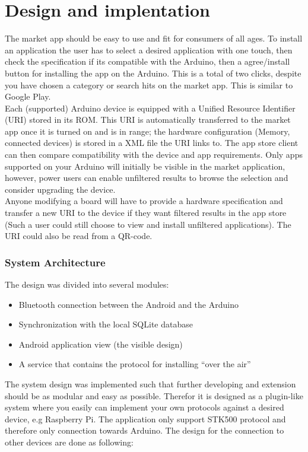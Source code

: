 \chapter{Design and implentation}
The market app should be easy to use and fit for consumers of all ages. To install an application the user has to select a desired application with one touch, then check the specification if its compatible with the Arduino, then a agree/install button for installing the app on the Arduino. This is a total of two clicks, despite you have chosen a category or search hits on the market app. This is similar to Google Play.\\
\newline
Each (supported) Arduino device is equipped with a Unified Resource Identifier (URI) stored in its ROM. This URI is automatically transferred to the market app once it is turned on and is in range; the hardware configuration (Memory, connected devices) is stored in a XML file the URI links to.
The app store client can then compare compatibility with the device and app requirements.
Only apps supported on your Arduino will initially be visible in the market application, however, power users can enable unfiltered results to browse the selection and consider upgrading the device.\\
\newline
Anyone modifying a board will have to provide a hardware specification and transfer a new URI to the device if they want filtered results in the app store (Such a user could still choose to view and install unfiltered applications).
The URI could also be read from a QR-code.

\subsection{System Architecture}
	The design was divided into several modules:
	\begin{itemize}
		\item{Bluetooth connection between the Android and the Arduino}
		\item{Synchronization with the local SQLite database}
		\item{Android application view (the visible design)}
		\item{A service that contains the protocol for installing ``over the air''}
	\end{itemize}

	The system design was implemented such that further developing and extension should be as modular and easy as possible.
	Therefor it is designed as a plugin-like system where you easily can implement your own protocols against a desired device, e.g Raspberry Pi. The application only support STK500 protocol and therefore only connection towards Arduino.
	The design for the connection to other devices are done as following:\\

